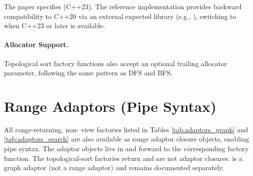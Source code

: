 The paper specifies  (C++23). The reference implementation provides backward compatibility to C++20 via an external expected library (e.g., ), switching to  when C++23 or later is available.

\paragraph{Allocator Support.}
Topological sort factory functions also accept an optional trailing allocator parameter, following the same pattern as DFS and BFS.

\section{Range Adaptors (Pipe Syntax)}

All range-returning, non- view factories listed in Tables \ref{tab:adaptors_graph} and \ref{tab:adaptors_search} are also available as range adaptor closure objects, enabling pipe syntax. The adaptor objects live in  and forward to the corresponding factory function. The  topological-sort factories return  and are not adaptor closures.  is a graph adaptor (not a range adaptor) and remains documented separately.

